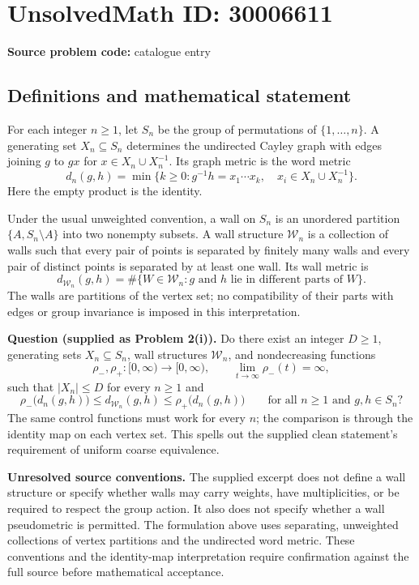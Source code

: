 \documentclass[11pt]{article}
\begin{document}
\section*{UnsolvedMath ID: 30006611}
\textbf{Source problem code:} catalogue entry
\subsection{Definitions and mathematical statement}
For each integer \(n\geq 1\), let \(S_n\) be the group of permutations of \(\{1,\ldots,n\}\). A generating set \(X_n\subseteq S_n\) determines the undirected Cayley graph with edges joining \(g\) to \(gx\) for \(x\in X_n\cup X_n^{-1}\). Its graph metric is the word metric
\[
d_n(g,h)=\min\bigl\{k\geq 0:g^{-1}h=x_1\cdots x_k,\quad x_i\in X_n\cup X_n^{-1}\bigr\}.
\]
Here the empty product is the identity.

Under the usual unweighted convention, a wall on \(S_n\) is an unordered partition \(\{A,S_n\setminus A\}\) into two nonempty subsets. A wall structure \(\mathcal W_n\) is a collection of walls such that every pair of points is separated by finitely many walls and every pair of distinct points is separated by at least one wall. Its wall metric is
\[
d_{\mathcal W_n}(g,h)=\#\bigl\{W\in\mathcal W_n: g\text{ and }h\text{ lie in different parts of }W\bigr\}.
\]
The walls are partitions of the vertex set; no compatibility of their parts with edges or group invariance is imposed in this interpretation.

\textbf{Question (supplied as Problem 2(i)).} Do there exist an integer \(D\geq 1\), generating sets \(X_n\subseteq S_n\), wall structures \(\mathcal W_n\), and nondecreasing functions
\[
\rho_-,\rho_+:[0,\infty)\longrightarrow[0,\infty),
\qquad \lim_{t\to\infty}\rho_-(t)=\infty,
\]
such that \(|X_n|\leq D\) for every \(n\geq 1\) and
\[
\rho_-\bigl(d_n(g,h)\bigr)
\leq d_{\mathcal W_n}(g,h)
\leq \rho_+\bigl(d_n(g,h)\bigr)
\qquad
\text{for all }n\geq 1\text{ and }g,h\in S_n?
\]
The same control functions must work for every \(n\); the comparison is through the identity map on each vertex set. This spells out the supplied clean statement's requirement of uniform coarse equivalence.

\textbf{Unresolved source conventions.} The supplied excerpt does not define a wall structure or specify whether walls may carry weights, have multiplicities, or be required to respect the group action. It also does not specify whether a wall pseudometric is permitted. The formulation above uses separating, unweighted collections of vertex partitions and the undirected word metric. These conventions and the identity-map interpretation require confirmation against the full source before mathematical acceptance.
\end{document}
